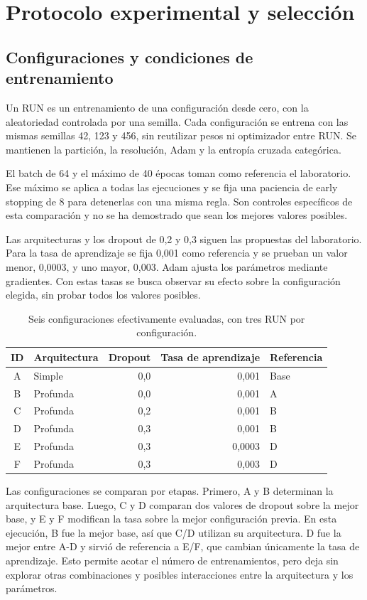\documentclass[11pt,letterpaper]{article}
\begin{document}
\section{Protocolo experimental y selección}
\subsection{Configuraciones y condiciones de entrenamiento}
Un RUN es un entrenamiento de una configuración desde cero, con la aleatoriedad controlada por una semilla. Cada configuración se entrena con las mismas semillas 42, 123 y 456, sin reutilizar pesos ni optimizador entre RUN. Se mantienen la partición, la resolución, Adam y la entropía cruzada categórica.

El batch de 64 y el máximo de 40 épocas toman como referencia el laboratorio. Ese máximo se aplica a todas las ejecuciones y se fija una paciencia de early stopping de 8 para detenerlas con una misma regla. Son controles específicos de esta comparación y no se ha demostrado que sean los mejores valores posibles.

Las arquitecturas y los dropout de 0,2 y 0,3 siguen las propuestas del laboratorio. Para la tasa de aprendizaje se fija 0,001 como referencia y se prueban un valor menor, 0,0003, y uno mayor, 0,003. Adam ajusta los parámetros mediante gradientes. Con estas tasas se busca observar su efecto sobre la configuración elegida, sin probar todos los valores posibles.

\begin{table}[H]
\centering\small
\begin{tabular}{clrrl}
\toprule
ID & Arquitectura & Dropout & Tasa de aprendizaje & Referencia \\
\midrule
A & Simple & 0,0 & 0,001 & Base \\
B & Profunda & 0,0 & 0,001 & A \\
C & Profunda & 0,2 & 0,001 & B \\
D & Profunda & 0,3 & 0,001 & B \\
E & Profunda & 0,3 & 0,0003 & D \\
F & Profunda & 0,3 & 0,003 & D \\
\bottomrule
\end{tabular}
\caption{Seis configuraciones efectivamente evaluadas, con tres RUN por configuración.}
\label{tab:configuraciones}
\end{table}

Las configuraciones se comparan por etapas. Primero, A y B determinan la arquitectura base. Luego, C y D comparan dos valores de dropout sobre la mejor base, y E y F modifican la tasa sobre la mejor configuración previa. En esta ejecución, B fue la mejor base, así que C/D utilizan su arquitectura. D fue la mejor entre A-D y sirvió de referencia a E/F, que cambian únicamente la tasa de aprendizaje. Esto permite acotar el número de entrenamientos, pero deja sin explorar otras combinaciones y posibles interacciones entre la arquitectura y los parámetros.
\end{document}
